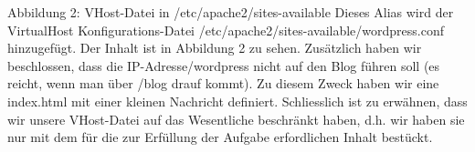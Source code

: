 \documentclass{article}
\begin{document}
	Abbildung 2: VHost-Datei in /etc/apache2/sites-available
	\newline
	\newline
	Dieses Alias wird der VirtualHost Konfigurations-Datei
	\newline
	/etc/apache2/sites-available/wordpress.conf hinzugefügt. Der Inhalt ist in Abbildung 2 zu sehen. Zusätzlich haben wir beschlossen, dass die
    \newline IP-Adresse/wordpress nicht auf den Blog führen soll (es reicht, wenn man über /blog drauf kommt). Zu diesem Zweck haben wir eine index.html mit einer kleinen Nachricht definiert. Schliesslich ist zu erwähnen, dass wir unsere VHost-Datei auf das Wesentliche beschränkt haben, d.h. wir haben sie nur mit dem für die zur Erfüllung der Aufgabe erfordlichen Inhalt bestückt.
	
\end{document}
